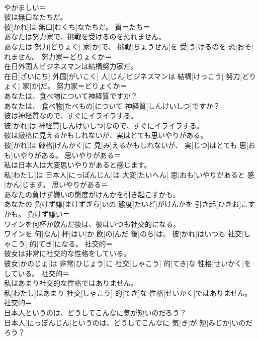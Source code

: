 \documentclass[8pt]{extreport}
\begin{document}
\begin{CJK}{UTF8}{min}
\\	やかましい＝ 
\\	彼は無口なたちだ。	
\\	彼[かれ]は 無口[むくち]なたちだ。	質＝たち＝ 
\\	あなたは努力家で、挑戦を受けるのを恐れません。	
\\	あなたは 努力[どりょく] 家[か]で、 挑戦[ちょうせん]を 受[う]けるのを 恐[おそ]れません。	努力家＝どりょくか＝ 
\\	在日外国人ビジネスマンは結構努力家だ。	
\\	在日[ざいにち] 外国[がいこく] 人[じん]ビジネスマンは 結構[けっこう] 努力[どりょく] 家[か]だ。	努力家＝どりょくか＝ 
\\	あなたは、食べ物について神経質ですか？	
\\	あなたは、 食べ物[たべもの]について 神経質[しんけいしつ]ですか？	
\\	彼は神経質なので、すぐにイライラする。	
\\	彼[かれ]は 神経質[しんけいしつ]なので、すぐにイライラする。	
\\	彼は厳格に見えるかもしれないが、実はとても思いやりがある。	
\\	彼[かれ]は 厳格[げんかく]に 見[み]えるかもしれないが、 実[じつ]はとても 思[おも]いやりがある。	思いやりがある＝ 
\\	私は日本人は大変思いやりがあると感じます。	
\\	私[わたし]は 日本人[にっぽんじん]は 大変[たいへん] 思[おも]いやりがあると 感[かん]じます。	思いやりがある＝ 
\\	あなたの負けず嫌いの態度がけんかを引き起こすかも。	
\\	あなたの 負けず嫌[まけずぎら]いの 態度[たいど]がけんかを 引き起[ひきお]こすかも。	負けず嫌い＝ 
\\	ワインを何杯か飲んだ後は、彼はいつも社交的になる。	
\\	ワインを 何[なん] 杯[はい]か 飲[の]んだ 後[のち]は、 彼[かれ]はいつも 社交[しゃこう] 的[てき]になる。	社交的＝ 
\\	彼女は非常に社交的な性格をしている。	
\\	彼女[かのじょ]は 非常[ひじょう]に 社交[しゃこう] 的[てき]な 性格[せいかく]をしている。	社交的＝ 
\\	私はあまり社交的な性格ではありません。	
\\	私[わたし]はあまり 社交[しゃこう] 的[てき]な 性格[せいかく]ではありません。	社交的＝ 
\\	日本人というのは、どうしてこんなに気が短いのだろう？	
\\	日本人[にっぽんじん]というのは、どうしてこんなに 気[き]が 短[みじか]いのだろう？	

\end{CJK}
\end{document}
